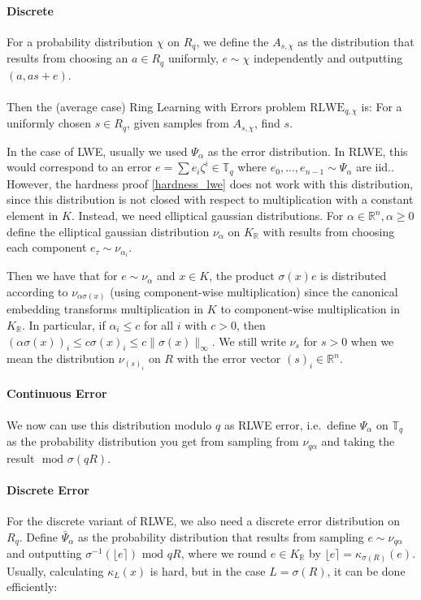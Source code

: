 \documentclass{report}
\newcommand{\T}{\mathbb{T}}
\newcommand{\R}{\mathbb{R}}
\renewcommand{\mod}{\text{ mod }}
\begin{document}
\paragraph{Discrete} For a probability distribution $\chi$ on $R_q$, we define the $A_{s, \chi}$ as the distribution that results from choosing an $a \in R_q$ uniformly, $e \sim \chi$ independently and outputting $(a, as + e)$.
\\\\
Then the (average case) Ring Learning with Errors problem $\mathrm{RLWE}_{q, \chi}$ is: For a uniformly chosen $s \in R_q$, given samples from $A_{s, \chi}$, find $s$.

\label{rlwe_error}
In the case of LWE, usually we used $\Psi_\alpha$ as the error distribution. In RLWE, this would correspond to an error $e = \sum e_i \zeta^i \in \T_q$ where $e_0, ..., e_{n - 1} \sim \Psi_\alpha$ are iid.. However, the hardness proof \ref{hardness_lwe} does not work with this distribution, since this distribution is not closed with respect to multiplication with a constant element in $K$. Instead, we need elliptical gaussian distributions. For $\alpha \in \R^n, \alpha \geq 0$ define the elliptical gaussian distribution $\nu_\alpha$ on $K_\R$ with results from choosing each component $e_\tau \sim \nu_{\alpha_i}$.

Then we have that for $e \sim \nu_\alpha$ and $x \in K$, the product $\sigma(x)e$ is distributed according to $\nu_{\alpha \sigma(x)}$ (using component-wise multiplication) since the canonical embedding transforms multiplication in $K$ to component-wise multiplication in $K_\R$. In particular, if $\alpha_i \leq c$ for all $i$ with $c > 0$, then $(\alpha \sigma(x))_i \leq c\sigma(x)_i \leq c \| \sigma(x) \|_\infty$. We still write $\nu_s$ for $s > 0$ when we mean the distribution $\nu_{(s)_i}$ on $R$ with the error vector $(s)_i \in \R^n$.

\paragraph{Continuous Error} We now can use this distribution modulo $q$ as RLWE error, i.e.\ define $\Psi_\alpha$ on $\T_q$ as the probability distribution you get from sampling from $\nu_{q\alpha}$ and taking the result $\mod \sigma(qR)$.

\paragraph{Discrete Error} For the discrete variant of RLWE, we also need a discrete error distribution on $R_q$. Define $\bar{\Psi}_\alpha$ as the probability distribution that results from sampling $e \sim \nu_{q \alpha}$ and outputting $\sigma^{-1}(\lfloor e \rceil) \mod qR$, where we round $e \in K_\R$ by $\lfloor e \rceil = \kappa_{\sigma(R)}(e)$. Usually, calculating $\kappa_L(x)$ is hard, but in the case $L = \sigma(R)$, it can be done efficiently:
\end{document}
